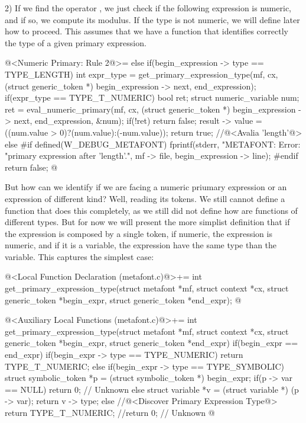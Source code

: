 2) If we find the operator , we just check if the
following expression is numeric, and if so, we compute its modulus. If
the type is not numeric, we will define later how to proceed. This
assumes that we have a function that identifies correctly the type of
a given primary expression.

\iniciocodigo
@<Numeric Primary: Rule 2@>=
else if(begin_expression -> type == TYPE_LENGTH){
  int expr_type = get_primary_expression_type(mf, cx,
                                             (struct generic_token *)
                                             begin_expression -> next,
                                             end_expression);
  if(expr_type == TYPE_T_NUMERIC){
    bool ret;
    struct numeric_variable num;
    ret = eval_numeric_primary(mf, cx, (struct generic_token *)
                               begin_expression -> next,
                               end_expression, &num);
    if(!ret)
      return false;
    result -> value = ((num.value > 0)?(num.value):(-num.value));
    return true;
  }
  //@<Avalia 'length'@>
  else{
#if defined(W_DEBUG_METAFONT)
    fprintf(stderr, "METAFONT: Error: %
            "primary expression after 'length'.\n", mf -> file,
            begin_expression -> line);
#endif
      return false;
  }
}
@
\fimcodigo

But how can we identify if we are facing a numeric priumary expression
or an expression of different kind? Well, reading its tokens. We still
cannot define a function that does this completely, as we still did
not define how are functions of different types. But for now we will
present the more simplist definition that if the expression is
composed by a single token, if numeric, the expression is numeric, and
if it is a variable, the expression have the same type than the
variable. This captures the simplest case:

\iniciocodigo
@<Local Function Declaration (metafont.c)@>+=
int get_primary_expression_type(struct metafont *mf, struct context *cx,
                               struct generic_token *begin_expr,
                               struct generic_token *end_expr);
@
\fimcodigo

\iniciocodigo
@<Auxiliary Local Functions (metafont.c)@>+=
int get_primary_expression_type(struct metafont *mf, struct context *cx,
                               struct generic_token *begin_expr,
                               struct generic_token *end_expr){
  if(begin_expr == end_expr){
    if(begin_expr -> type == TYPE_NUMERIC)
      return TYPE_T_NUMERIC;
    else if(begin_expr -> type == TYPE_SYMBOLIC){
      struct symbolic_token *p = (struct symbolic_token *) begin_expr;
      if(p -> var == NULL)
        return 0; // Unknown
      else{
        struct variable *v = (struct variable *) (p -> var);
        return v -> type;
      }
    }
  }
  else{
    //@<Discover Primary Expression Type@>
  }
  return TYPE_T_NUMERIC;
  //return 0; // Unknown
}
@
\fimcodigo

